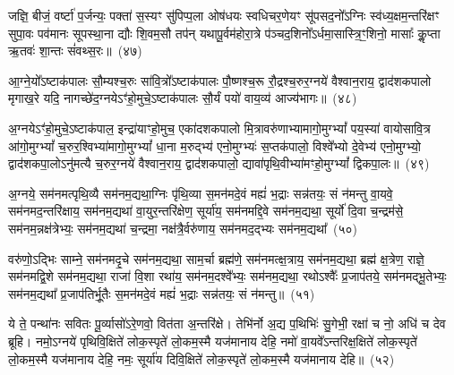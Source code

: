 जज्ञि॒ बीजं॒ वर्\mbox{}ष्टा॑ प॒र्जन्यः॒ पक्ता॑ स॒स्यꣳ सु॑पिप्प॒ला ओष॑धयः स्वधिचर॒णेयꣳ सू॑पसद॒नो᳚\-ऽग्निः स्व॑ध्य॒क्षम॒न्तरि॑क्षꣳ सुपा॒वः पव॑मानः सूपस्था॒ना द्यौः शि॒वम॒सौ तप॑न् यथापू॒र्वम॑होरा॒त्रे प॑ञ्चद॒शिनो᳚\-ऽर्धमा॒सास्त्रि॒ꣳ॒शिनो॒ मासाः᳚ कॢ॒प्ता ऋ॒तवः॑ शा॒न्तः सं॑वथ्स॒रः॥~(४७)\ip

{\anuvakamend[{जज्ञि॒ बीज॒मेक॑त्रिꣳशत्}]}%

आ॒ग्ने॒यो᳚\-ऽष्टाक॑पालः सौ॒म्यश्च॒रुः सा॑वि॒त्रो᳚\-ऽष्टाक॑पालः पौ॒ष्णश्च॒रू रौ॒द्रश्च॒रुर॒ग्नये॑ वैश्वान॒राय॒ द्वाद॑श\-कपालो मृगाख॒रे यदि॒ नागच्छे॑द॒ग्नये\-ऽꣳ॑हो॒मुचे॒\-ऽष्टाक॑पालः सौ॒र्यं पयो॑ वाय॒व्य॑ आज्य॑भागः॥~(४८)\ip

{\anuvakamend[{आ॒ग्ने॒यश्चतु॑र्विꣳशतिः}]}%

अ॒ग्नये\-ऽꣳ॑हो॒मुचे॒\-ऽष्टाक॑पाल॒ इन्द्रा॑याꣳहो॒मुच॒ एका॑\-दश\-कपालो मि॒त्रावरु॑णाभ्यामागो॒मुग्\-भ्यां᳚ पय॒स्या॑ वायोसावि॒त्र आ॑गो॒मुग्\-भ्यां᳚ च॒रुर॒श्विभ्या॑मागो॒मुग्\-भ्यां᳚ धा॒ना म॒रुद्भ्य॑ एनो॒मुग्भ्यः॑ स॒प्तक॑पालो॒ विश्वे᳚भ्यो दे॒वेभ्य॑ एनो॒मुग्भ्यो॒ द्वाद॑श\-कपा॒लो\-ऽनु॑मत्यै च॒रुर॒ग्नये॑ वैश्वान॒राय॒ द्वाद॑श\-कपालो॒ द्यावा॑\-पृथि॒वीभ्या॑मꣳहो॒मुग्\-भ्यां᳚ द्विकपा॒लः॥~(४९)\ip

{\anuvakamend[{अ॒ग्नये\-ऽꣳ॑हो॒मुचे᳚ त्रि॒ꣳ॒शत्}]}%

अ॒ग्नये॒ सम॑नमत्पृथि॒व्यै सम॑नम॒द्यथा॒ग्निः पृ॑थि॒व्या स॒मन॑मदे॒वं मह्यं॑ भ॒द्राः सन्न॑तयः॒ सं न॑मन्तु वा॒यवे॒ सम॑नमद॒न्तरि॑क्षाय॒ सम॑नम॒द्यथा॑ वा॒युर॒न्तरि॑क्षेण॒ सूर्या॑य॒ सम॑नमद्दि॒वे सम॑नम॒द्यथा॒ सूर्यो॑ दि॒वा च॒न्द्रम॑से॒ सम॑नम॒न्नक्ष॑त्रेभ्यः॒ सम॑नम॒द्यथा॑ च॒न्द्रमा॒ नक्ष॑त्रै॒र्वरु॑णाय॒ सम॑नमद॒द्भ्यः सम॑नम॒द्यथा᳚~(५०)\ip

वरु॑णो॒\-ऽद्भिः साम्ने॒ सम॑नमदृ॒चे सम॑नम॒द्यथा॒ साम॒र्चा ब्रह्म॑णे॒ सम॑नमत्क्ष॒त्राय॒ सम॑नम॒द्यथा॒ ब्रह्म॑ क्ष॒त्रेण॒ राज्ञे॒ सम॑नमद्वि॒शे सम॑नम॒द्यथा॒ राजा॑ वि॒शा रथा॑य॒ सम॑नम॒दश्वे᳚भ्यः॒ सम॑नम॒द्यथा॒ रथो\-ऽश्वैः᳚ प्र॒जा\-प॑तये॒ सम॑नमद्भू॒तेभ्यः॒ सम॑नम॒द्यथा᳚ प्र॒जा\-प॑तिर्भू॒तैः स॒मन॑मदे॒वं मह्यं॑ भ॒द्राः सन्न॑तयः॒ सं न॑मन्तु॥~(५१)\ip

{\anuvakamend[{अ॒द्भ्यः सम॑नम॒द्यथा॒ मह्यं॑ च॒त्वारि॑ च}]}%

ये ते॒ पन्था॑नः सवितः पू॒र्व्यासो॑\-ऽरे॒णवो॒ वित॑ता अ॒न्तरि॑क्षे। तेभि॑र्नो अ॒द्य प॒थिभिः॑ सु॒गेभी॒ रक्षा॑ च नो॒ अधि॑ च देव ब्रूहि। नमो॒\-ऽग्नये॑ पृथिवि॒क्षिते॑ लोक॒स्पृते॑ लो॒कम॒स्मै यज॑मानाय देहि॒ नमो॑ वा॒यवे᳚\-ऽन्तरिक्ष॒क्षिते॑ लोक॒स्पृते॑ लो॒कम॒स्मै यज॑मानाय देहि॒ नमः॒ सूर्या॑य दिवि॒क्षिते॑ लोक॒स्पृते॑ लो॒कम॒स्मै यज॑मानाय देहि॥~(५२)\ip

{\anuvakamend[{ये ते॒ चतु॑श्चत्वारिꣳशत्}]}%

